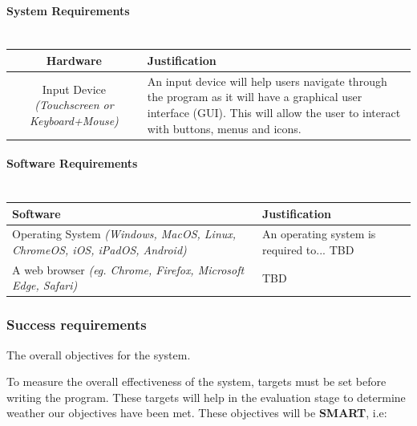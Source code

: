 \documentclass{article}
\begin{document}
\paragraph{System Requirements\\\\}

\begin{tabular}{ |c|p{}| }
    \hline
    \textbf{Hardware} & \textbf{Justification}\\
    \hline
    Input Device \textit{(Touchscreen or Keyboard+Mouse)} & An input device will help users navigate through the program as it will have a graphical user interface (GUI). This will allow the user to interact with buttons, menus and icons. \\
    \hline
\end{tabular}

\paragraph{Software Requirements\\\\}

\begin{tabular}{ |p{}|p{}| }
    \hline
    \textbf{Software} & \textbf{Justification}\\
    \hline
    Operating System \textit{(Windows, MacOS, Linux, ChromeOS, iOS, iPadOS, Android)} &
    An operating system is required to... TBD\\
    \hline
    A web browser \textit{(eg. Chrome, Firefox, Microsoft Edge, Safari)} & TBD\\
    \hline
\end{tabular}

\pagebreak

\subsubsection{Success requirements}

The overall objectives for the system.

\noindent To measure the overall effectiveness of the system, targets must be set before writing the program.
These targets will help in the evaluation stage to determine weather our objectives have been met.
These objectives will be \textbf{SMART}, i.e:
\end{document}
